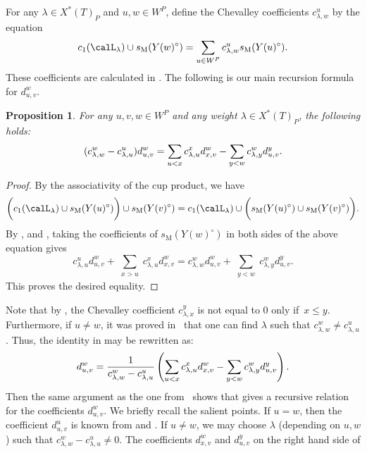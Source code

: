 \documentclass[11pt]{article}
\newtheorem{prop}[theo]{Proposition}
\theoremstyle{definition}
\numberwithin{equation}{section}
\newcommand{\ssm}{s_{\mathrm{M}}}
\begin{document}
For any $\lambda\in X^*(T)_P$ and $u,w\in W^P$, define the Chevalley coefficients $c^u_{\lambda,w}$ by the equation
\begin{equation}\label{equ:ccoeff}
	c_1(\calL_\lambda)\cup \ssm (Y(w)^\circ)=
	\sum_{u\in W^P} c_{\lambda,w}^{u} \ssm (Y(u)^\circ).
\end{equation}
These coefficients are calculated in . The following is 
our main recursion formula for $d_{u,v}^w$.
\begin{prop}
	\label{lem:recLR}
	For any $u,v,w\in W^P$ and any weight $\lambda\in X^*(T)_P$, 
	the following holds:
	$$
	(c^w_{\lambda,w} - c^u_{\lambda,u}) d^w_{u,v}=
	\sum_{\substack{u< x}} 
	c^x_{\lambda,u}d^w_{x,v}-\sum_{\substack{ y<w}} c^w_{\lambda,y} d^y_{u,v} \/.
	$$
\end{prop}
\begin{proof}
	By the associativity of the cup product, we have
	\[
	\bigg( c_1(\calL_\lambda) \cup \ssm({Y(u)^\circ}) \bigg)\cup \ssm({Y(v)^\circ})
	=c_1(\calL_\lambda) \cup \bigg( \ssm({Y(u)^\circ})\cup \ssm({Y(v)^\circ}) \bigg).
	\]
	By ,  and ,
	taking the coefficients of $\ssm({Y(w)^\circ})$ in both sides of the above equation gives
	$$c^u_{\lambda,u} d^w_{u,v}+\sum_{\substack{x > u}}
	c^x_{\lambda,u} d^w_{x,v}=
	c^w_{\lambda,w} d^w_{u,v}+\sum_{\substack{y< w}}
	c^w_{\lambda,y} d^y_{u,v}.$$
	This proves the desired equality.
\end{proof}
Note that by , the Chevalley coefficient $c_{\lambda, x}^{y}$ is not equal to $0$ 
only if~$x \le y$.
Furthermore, if $u \neq w$, it was proved in~\cite[Proposition A.3]{mihalcea:eqqhom} that
one can find $\lambda$ such that $c^w_{\lambda,w} \neq c^u_{\lambda,u}$.
Thus, the identity in  may be rewritten as:
\begin{equation}
	\label{eq:recLR}
	d^w_{u,v}=\frac{ 1 }{ c^w_{\lambda,w} - c^u_{\lambda,u}}\left( \sum_{\substack{ u < x}} 
	c^x_{\lambda,u}d^w_{x,v} -\sum_{\substack{ y < w}} c^w_{\lambda,y} d^y_{u,v}\right) \/.
\end{equation}
Then the same argument as the one from~\cite{mihalcea:eqqhom} shows that 
 gives a recursive relation for the 
coefficients $d_{u,v}^w$. We briefly recall the salient points. 
If $u=w$, then the coefficient $d_{u,v}^u$ is known from 
 and . If
$u \neq w$, we may choose $\lambda$ (depending on $u,w$) such that
$c^w_{\lambda,w} - c^u_{\lambda,u} \neq 0$. The
coefficients $d_{x,v}^w$ and $d_{u,v}^y$ on the right hand side of
\end{document}
